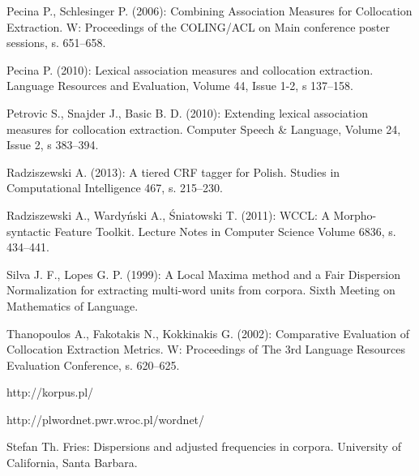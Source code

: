 \documentclass[11pt,a4paper]{llncs}
\begin{document}
\begin{thebibliography}{4}
  	Pecina P., Schlesinger P. (2006): Combining Association Measures for Collocation Extraction. W: Proceedings of the COLING/ACL on Main conference poster sessions, s. 651--658.
  
Pecina P. (2010): Lexical association measures and collocation extraction. Language Resources and Evaluation, Volume 44, Issue 1-2, s 137--158.


	Petrovic S., Snajder J., Basic B. D. (2010): Extending lexical association measures for collocation extraction. Computer Speech \& Language, Volume 24, Issue 2, s 383--394.

	
 Radziszewski A. (2013): A tiered CRF tagger for Polish. Studies in Computational Intelligence 467, s. 215--230.

	 
	Radziszewski A., Wardyński A., Śniatowski T. (2011): WCCL: A Morpho-syntactic Feature Toolkit. Lecture Notes in Computer Science Volume 6836, s. 434--441.
	
	Silva J. F., Lopes G. P. (1999): A Local Maxima method and a Fair Dispersion Normalization for extracting multi-word units from corpora.
	Sixth Meeting on Mathematics of Language.

		
	Thanopoulos A., Fakotakis N., Kokkinakis G. (2002): Comparative Evaluation of Collocation Extraction Metrics.
	W: Proceedings of The 3rd Language Resources Evaluation Conference, s. 620--625.
	

 http://korpus.pl/

	http://plwordnet.pwr.wroc.pl/wordnet/
	
	Stefan Th. Fries: Dispersions and adjusted frequencies in corpora.
	University of California, Santa Barbara.


\end{thebibliography}
\end{document}
